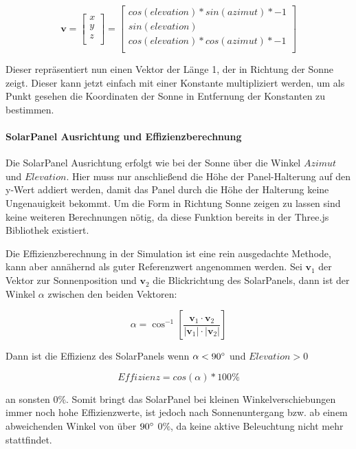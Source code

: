 \[
\mathbf{v} = \begin{bmatrix}
x \\
y \\
z \\
\end{bmatrix}
=
\begin{bmatrix}
cos(elevation) * sin(azimut) * -1 \\
sin(elevation) \\
cos(elevation) * cos(azimut) * -1 \\
\end{bmatrix}
\]

Dieser repräsentiert nun einen Vektor der Länge 1, der in Richtung der Sonne zeigt. Dieser kann jetzt einfach mit einer Konstante multipliziert werden, um als Punkt gesehen die Koordinaten der Sonne in Entfernung der Konstanten zu bestimmen.

\paragraph{SolarPanel Ausrichtung und Effizienzberechnung}

Die SolarPanel Ausrichtung erfolgt wie bei der Sonne über die Winkel $Azimut$ und $Elevation$. Hier muss nur anschließend die Höhe der Panel-Halterung auf den y-Wert addiert werden, damit das Panel durch die Höhe der Halterung keine Ungenauigkeit bekommt. Um die Form in Richtung Sonne zeigen zu lassen sind keine weiteren Berechnungen nötig, da diese Funktion bereits in der Three.js Bibliothek existiert.

Die Effizienzberechnung in der Simulation ist eine rein ausgedachte Methode, kann aber annähernd als guter Referenzwert angenommen werden.
Sei $\mathbf{v}_{\mathrm{1}}$ der Vektor zur Sonnenposition und $\mathbf{v}_{\mathrm{2}}$ die Blickrichtung des SolarPanels, dann ist der Winkel $\alpha$ zwischen den beiden Vektoren:

\[
\alpha = \cos^{-1} \left[\frac{\mathbf{v}_{1} \cdot \mathbf{v}_{2}}{|\mathbf{v}_{1}| \cdot |\mathbf{v}_{2}|}\right]
\]

Dann ist die Effizienz des SolarPanels wenn $\alpha < 90\degree$ und $Elevation > 0$

\[
Effizienz = cos(\alpha) * 100\%
\]

an sonsten $0\%$. Somit bringt das SolarPanel bei kleinen Winkelverschiebungen immer noch hohe Effizienzwerte, ist jedoch nach Sonnenuntergang bzw. ab einem abweichenden Winkel von über $90\degree$ $0\%$, da keine aktive Beleuchtung nicht mehr stattfindet.

